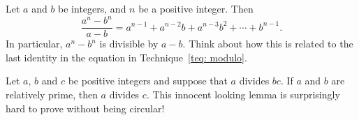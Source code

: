 \begin{lemma}
    \label{lem: divisibilityGP}
    Let $a$ and $b$ be integers, and $n$ be a positive integer. Then 
    \[ \frac{a^n - b^n}{a - b} = a^{n - 1} + a^{n - 2}b + a^{n - 3}b^2 + \cdots + b^{n - 1}. \]
    In particular, $a^n - b^n$ is divisible by $a - b$. Think about how this is
    related to the last identity in the equation in Technique~\ref{teq: modulo}.
\end{lemma}


\begin{lemma}[Euclid]
    \label{lem: euclid}
    Let $a$, $b$ and $c$ be positive integers and suppose that $a$ divides $bc$.
    If $a$ and $b$ are relatively prime, then $a$ divides $c$. This innocent
    looking lemma is surprisingly hard to prove without being circular!
\end{lemma}


